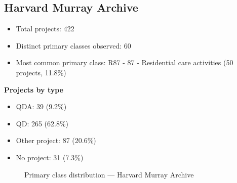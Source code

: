 \subsection{Harvard Murray Archive}

\begin{itemize}
    \item Total projects: 422
    \item Distinct primary classes observed: 60
    \item Most common primary class: R87 - 87 - Residential care activities (50 projects, 11.8\%)
\end{itemize}
\textbf{Projects by type}
\begin{itemize}
    \item QDA: 39 (9.2\%)
    \item QD: 265 (62.8\%)
    \item Other project: 87 (20.6\%)
    \item No project: 31 (7.3\%)
\end{itemize}

\begin{figure}[h]
    \centering
    
    \caption{Primary class distribution --- Harvard Murray Archive}
\end{figure}

